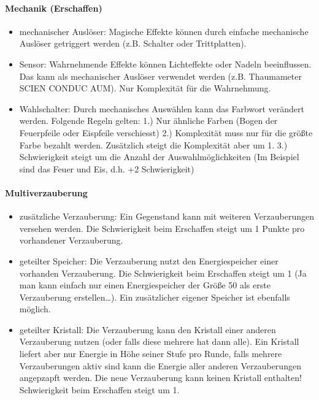 \documentclass{article}
\begin{document}
\paragraph{Mechanik (Erschaffen)}

\begin{itemize}
\item mechanischer Auslöser: Magische Effekte können durch einfache mechanische Auslöser getriggert werden (z.B. Schalter oder Trittplatten).
\item Sensor: Wahrnehmende Effekte können Lichteffekte oder Nadeln beeinflussen. Das kann als mechanischer Auslöser verwendet werden (z.B. Thaumameter SCIEN CONDUC AUM). Nur Komplexität für die Wahrnehmung.
\item Wahlschalter: Durch mechanisches Auswählen kann das Farbwort verändert werden. Folgende Regeln gelten: 1.) Nur ähnliche Farben (Bogen der Feuerpfeile oder Eispfeile verschiesst) 2.) Komplexität muss nur für die größte Farbe bezahlt werden. Zusätzlich steigt die Komplexität aber um 1. 3.) Schwierigkeit steigt um die Anzahl der Auswahlmöglichkeiten (Im Beispiel sind das Feuer und Eis, d.h. +2 Schwierigkeit)
\end{itemize}

\paragraph{Multiverzauberung}

\begin{itemize}
\item zusätzliche Verzauberung: Ein Gegenstand kann mit weiteren Verzauberungen versehen werden. Die Schwierigkeit beim Erschaffen steigt um 1 Punkte pro vorhandener Verzauberung.
\item geteilter Speicher: Die Verzauberung nutzt den Energiespeicher einer vorhanden Verzauberung. Die Schwierigkeit beim Erschaffen steigt um 1 (Ja man kann einfach nur einen Energiespeicher der Größe 50 als erste Verzauberung erstellen…). Ein zusätzlicher eigener Speicher ist ebenfalls möglich.
\item geteilter Kristall: Die Verzauberung kann den Kristall einer anderen Verzauberung nutzen (oder falls diese mehrere hat dann alle). Ein Kristall liefert aber nur Energie in Höhe seiner Stufe pro Runde, falls mehrere Verzauberungen aktiv sind kann die Energie aller anderen Verzauberungen angepzapft werden. Die neue Verzauberung kann keinen Kristall enthalten! Schwierigkeit beim Erschaffen steigt um 1.
\end{itemize}
\end{document}
